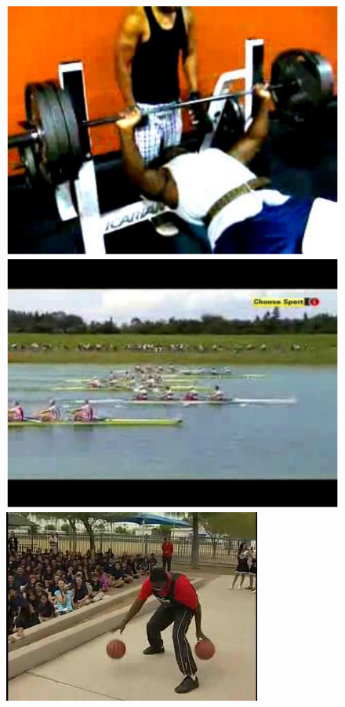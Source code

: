 \documentclass[10pt,twocolumn,letterpaper]{article}
\begin{document}
\begin{figure}[!t]
\begin{center}
\includegraphics[scale=0.25]{figures/dataset_thumb/ucf/crop_class5.pdf} 
\includegraphics[scale=0.25]{figures/dataset_thumb/ucf/crop_class6.pdf} \\
\includegraphics[scale=0.20]{figures/dataset_thumb/hmdb/class1.png}

\end{center}
\end{figure}
\end{document}
